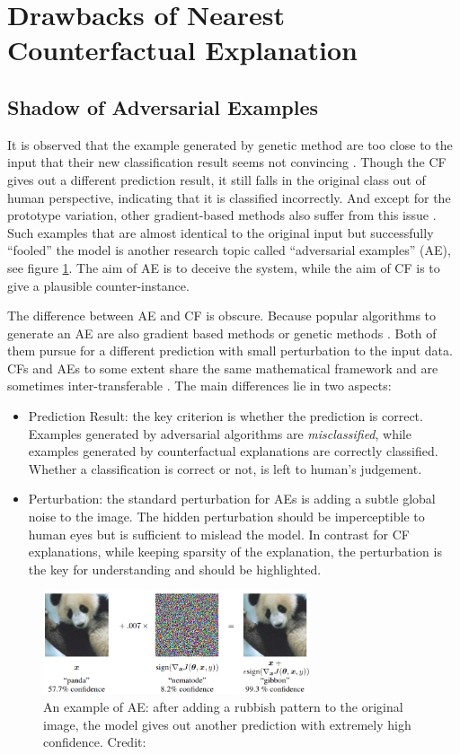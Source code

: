 \section{Drawbacks of Nearest Counterfactual Explanation}\label{sec:adversarial}

\subsection{Shadow of Adversarial Examples}
It is observed that the example generated by genetic method are too close to the input that their new classification result seems not convincing \cite{onePixel,certifai}. Though the CF gives out a different prediction result, it still falls in the original class out of human perspective, indicating that it is classified incorrectly. And except for the prototype variation, other gradient-based methods also suffer from this issue \cite{prototype}. Such examples that are almost identical to the original input but successfully ``fooled'' the model is another research topic called ``adversarial examples'' (AE), see figure \ref{fig:AE}. The aim of AE is to deceive the system, while the aim of CF is to give a plausible counter-instance.

The difference between AE and CF is obscure. Because popular algorithms to generate an AE are also gradient based methods or genetic methods \cite{AEoverview}. Both of them pursue for a different prediction with small perturbation to the input data. CFs and AEs to some extent share the same mathematical framework and are sometimes inter-transferable \cite{CFandAE}. The main differences lie in two aspects:
\begin{itemize}
  \item Prediction Result: the key criterion is whether the prediction is correct. Examples generated by adversarial algorithms are \emph{misclassified}, while examples generated by counterfactual explanations are correctly classified. Whether a classification is correct or not, is left to human's judgement.
  \item Perturbation: the standard perturbation for AEs is adding a subtle global noise to the image. The hidden perturbation should be imperceptible to human eyes but is sufficient to mislead the model. In contrast for CF explanations, while keeping sparsity of the explanation, the perturbation is the key for understanding and should be highlighted.  %
\end{itemize}
\begin{figure}
  \centering
  \includegraphics[width=0.7\textwidth]{adversarial.PNG}
  \caption{An example of AE: after adding a rubbish pattern to the original image, the model gives out another prediction with extremely high confidence. Credit: \cite{goodfellow2014explaining}}
  \label{fig:AE}
\end{figure}


